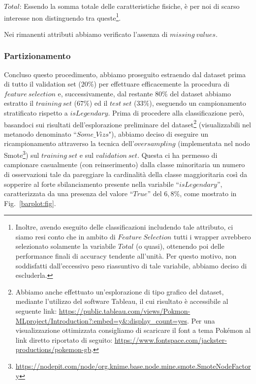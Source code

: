 \documentclass[fleqn,10pt]{SelfArx} %
\begin{document}
$Total$: Essendo la somma totale delle caratteristiche fisiche, è per noi di scarso interesse non distinguendo tra queste\footnote{Inoltre, avendo eseguito delle classificazioni includendo tale attributo, ci siamo resi conto che in ambito di $Feature\ Selection$ tutti i wrapper avrebbero selezionato solamente la variabile $Total$ (o quasi), ottenendo poi delle performance finali di accuracy tendente all'unità. Per questo motivo, non soddisfatti dall'eccessivo peso riassuntivo di tale variabile, abbiamo deciso di escluderla.}.

Nei rimanenti attributi abbiamo verificato l'assenza di $missing\ values$.
\subsubsection{Partizionamento}Concluso questo procedimento, abbiamo proseguito estraendo dal dataset prima di tutto il validation set ($20\%$) per effettuare efficacemente la procedura di $feature\ selection$ e, successivamente, dal restante $80\%$ del dataset abbiamo estratto il $training\ set$ ($67\%$) ed il $test\ set$ ($33\%$), eseguendo un campionamento stratificato rispetto a $isLegendary$.
Prima di procedere alla classificazione però, basandoci sui risultati dell'esplorazione preliminare del dataset\footnote{Abbiamo anche effettuato un'esplorazione di tipo grafico del dataset, mediante l'utilizzo del software Tableau, il cui risultato è accessibile al seguente link: \url{https://public.tableau.com/views/Pokmon-MLproject/Introduction?:embed=y&:display_count=yes}. Per una visualizzazione ottimizzata consigliamo di scaricare il font a tema Pokémon al link diretto riportato di seguito: \url{https://www.fontspace.com/jackster-productions/pokemon-gb}.} (visualizzabili nel metanodo denominato ``$Some\_Vizs$"), abbiamo deciso di eseguire un ricampionamento attraverso la tecnica dell’$oversampling$ (implementata nel nodo Smote\footnote{\url{https://nodepit.com/node/org.knime.base.node.mine.smote.SmoteNodeFactory}})
\cite{brownlee} %
sul $training\ set$ e sul $validation\ set$. Questa ci ha permesso di campionare casualmente (con reinserimento) dalla classe minoritaria un numero di osservazioni tale da pareggiare la cardinalità della classe maggioritaria così da sopperire al forte sbilanciamento presente nella variabile ``$isLegendary$”, caratterizzata da una presenza del valore ``$True$” del $6,8\%$, come mostrato in Fig.~\ref{barplot:fig}.
\end{document}

